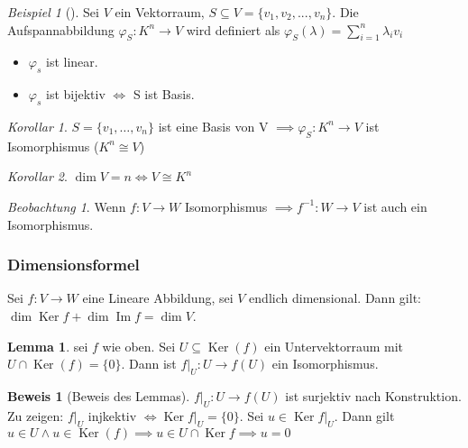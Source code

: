 \documentclass[11pt]{article}
\DeclareMathOperator{\mdim}{dim}
\DeclareMathOperator{\mKer}{Ker}
\DeclareMathOperator{\mIm}{Im}
\theoremstyle{remark}
\newtheorem{exa}{Beispiel}[section]
\theoremstyle{definition}
\newtheorem{prof}{Beweis}
\newtheorem*{lemma}{Lemma}
\theoremstyle{remark}
\newtheorem*{korollar}{Korollar}
\newtheorem*{beobachtung}{Beobachtung}
\begin{document}
\begin{exa}[] \label{}
Sei \(V\) ein Vektorraum, \(S\subseteq V = \{v_1, v_2, ..., v_n\}\). Die
Aufspannabbildung $\varphi_S: K^n \rightarrow V$ wird definiert als $\varphi_S(\lambda)=\sum_{i=1}^{n}\lambda_i v_i$

\begin{itemize}
	\item \(\varphi_s\) ist linear.
	\item \(\varphi_s\) ist bijektiv \(\iff\) S ist Basis.
\end{itemize}
\end{exa}

\begin{korollar}
	\(S=\{v_1,\ldots,v_n\}\) ist eine Basis von V $\implies \varphi_S: K^n \rightarrow V$ ist Isomorphismus ($K^n\cong V$)
\end{korollar}

\begin{korollar}
	\(\dim V = n \iff V\cong K^n\)
\end{korollar}

\begin{beobachtung}
	Wenn \(f:V\rightarrow W\) Isomorphismus $\implies f^{-1}:W\rightarrow V $ ist auch ein Isomorphismus.
\end{beobachtung}

\subsubsection{Dimensionsformel}
\label{sec:org9a58004}
\begin{theo}{}{}
Sei \(f:V\to W\) eine Lineare Abbildung, sei \(V\) endlich dimensional. Dann gilt: \(\mdim\mKer f + \mdim\mIm f = \mdim V\).
\end{theo}

\begin{lemma} sei \(f\) wie oben. Sei \(U \subseteq \mKer(f)\) ein Untervektorraum mit \(U \cap \mKer(f) = \{0\}\).  Dann ist \(f|_U:U\to f(U)\) ein Isomorphismus.
\end{lemma}

\begin{prof}[Beweis des Lemmas] \label{}
\(f|_U:U\to f(U)\) ist surjektiv nach Konstruktion. Zu zeigen: \(f|_U\) injkektiv \(\iff \mKer f|_U = \{0\}\). Sei \(u\in \mKer f|_U \). Dann gilt \(u\in U \land u \in \mKer(f) \implies u \in U \cap \mKer f \implies u = 0\)
\end{prof}
\end{document}
